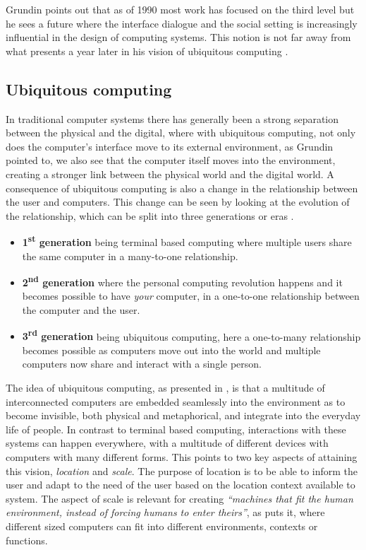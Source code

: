 Grundin points out that as of 1990 most work has focused on the third level but he sees a future where the interface dialogue and the social setting is increasingly influential in the design of computing systems.
This notion is not far away from what \citeauthor{weiser1991computer} presents a year later in his vision of ubiquitous computing \citep{weiser1991computer}.

\subsection{Ubiquitous computing}
In traditional computer systems there has generally been a strong separation between the physical and the digital, where with ubiquitous computing, not only does the computer's interface move to its external environment, as Grundin pointed to, we also see that the computer itself moves into the environment, creating a stronger link between the physical world and the digital world.
A consequence of ubiquitous computing is also a change in the relationship between the user and computers.
This change can be seen by looking at the evolution of the relationship, which can be split into three generations or eras \citep{weiser1997coming,abowd2012next}.
\begin{itemize}
\item[] \textbf{1\textsuperscript{st} generation} being terminal based computing where multiple users share the same computer in a many-to-one relationship.
\item[] \textbf{2\textsuperscript{nd} generation} where the personal computing revolution happens and it becomes possible to have \emph{your} computer, in a one-to-one relationship between the computer and the user.
\item[] \textbf{3\textsuperscript{rd} generation} being ubiquitous computing, here a one-to-many relationship becomes possible as computers move out into the world and multiple computers now share and interact with a single person.
\end{itemize}

The idea of ubiquitous computing, as presented in \citep{weiser1991computer}, is that a multitude of interconnected computers are embedded seamlessly into the environment as to become invisible, both physical and metaphorical, and integrate into the everyday life of people.
In contrast to terminal based computing, interactions with these systems can happen everywhere, with a multitude of different devices with computers with many different forms. 
This points to two key aspects of attaining this vision, \emph{location} and \emph{scale}.
The purpose of location is to be able to inform the user and adapt to the need of the user based on the location context available to system. 
The aspect of scale is relevant for creating \emph{``machines that fit the human environment, instead of
forcing humans to enter theirs''}, as \citeauthor{weiser1991computer} puts it, where different sized computers can fit into different environments, contexts or functions. 

